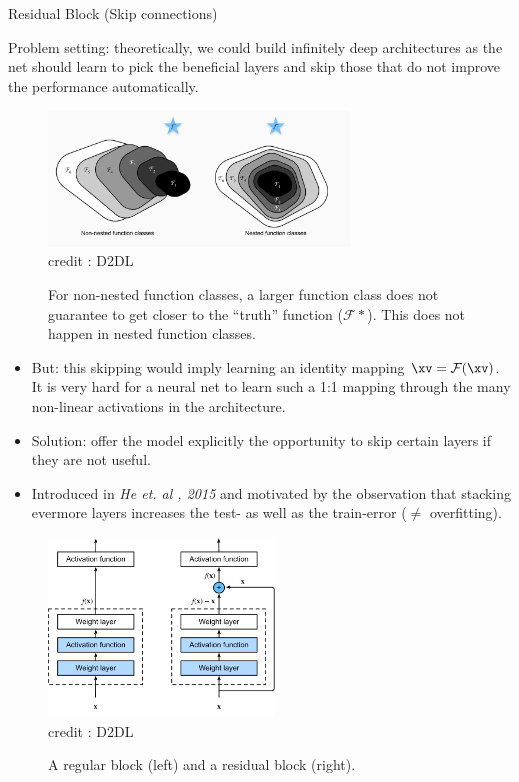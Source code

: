 \begin{vbframe}{Residual Block (Skip connections)}

Problem setting: theoretically, we could build infinitely deep architectures as the net should learn to pick the beneficial layers and skip those that do not improve the performance automatically.

 \begin{figure}
  \centering
    \includegraphics[width=8cm]{plots/moderncnn/resnet_problem.png}
    \tiny{\\ credit : D2DL}
    \caption{For non-nested function classes, a larger function class does not guarantee to get closer to the “truth” function ($\mathcal{F}*$). This does not happen in nested function classes.}
  \end{figure}



    \begin{itemize}
        \item But: this skipping would imply learning an identity mapping $\xv = \mathcal{F}(\xv)$. It is very hard for a neural net to learn such a 1:1 mapping through the many non-linear activations in the architecture.
        \item Solution: offer the model explicitly the opportunity to skip certain layers if they are not useful.
        \item Introduced in \textit{He et. al , 2015} and motivated by the observation that stacking evermore layers increases the test- as well as the train-error ($\neq$ overfitting).
    \end{itemize}
\framebreak
 
 \begin{figure}
  \centering
    \includegraphics[width=6cm]{plots/moderncnn/residual-block.png}
    \tiny{\\ credit : D2DL}
    \caption{A regular block (left) and a residual block (right).}
  \end{figure}


\end{vbframe}
